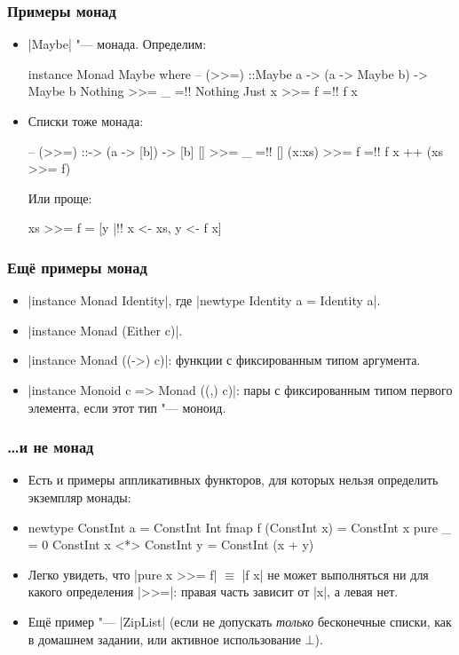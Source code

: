 \documentclass[11pt]{beamer}
\begin{document}
\begin{frame}[fragile]
  \frametitle{Примеры монад}
  \begin{itemize}[<+->]
    \item \haskinline|Maybe| "--- монада. Определим:
          \begin{haskell}
            instance Monad Maybe where
              -- (>{}>=) ::\pause Maybe a -> (a -> Maybe b) -> Maybe b
              Nothing >>= _ =!\pause! Nothing
              Just x  >>= f =!\pause! f x
          \end{haskell}
    \item Списки тоже монада:
          \begin{haskell}
            -- (>{}>=) ::\pause [a] -> (a -> [b]) -> [b]
            []     >>= _ =!\pause! []
            (x:xs) >>= f =!\pause! f x ++ (xs >>= f)
          \end{haskell}
          Или проще:
          \begin{haskell}
            xs >>= f = [y |!\pause! x <- xs, y <- f x]
          \end{haskell}
  \end{itemize}
\end{frame}

\begin{frame}[fragile]
  \frametitle{Ещё примеры монад}
  \begin{itemize}
    \item \haskinline|instance Monad Identity|, где \haskinline|newtype Identity a = Identity a|.
    \item \haskinline|instance Monad (Either c)|.
    \item \haskinline|instance Monad ((->) c)|: функции с фиксированным типом аргумента.
    \item \haskinline|instance Monoid c => Monad ((,) c)|: пары с фиксированным типом первого элемента, если этот тип "--- моноид.
  \end{itemize}
\end{frame}

\begin{frame}[fragile]
  \frametitle{\ldots и не монад}
  \begin{itemize}
    \item Есть и примеры аппликативных функторов, для которых нельзя определить экземпляр монады:
    \item
          \begin{haskell}
            newtype ConstInt a = ConstInt Int
            fmap f (ConstInt x) = ConstInt x
            pure _ = 0
            ConstInt x <*> ConstInt y = ConstInt (x + y)
          \end{haskell}
    \item Легко увидеть, что \haskinline|pure x >>= f| $\equiv$ \haskinline|f x| не может выполняться ни для какого определения \haskinline|>>=|: правая часть зависит от \haskinline|x|, а левая нет.
          \pause
    \item Ещё пример "--- \haskinline|ZipList| (если не допускать \emph{только} бесконечные списки, как в домашнем задании, или активное использование $\bot$).
  \end{itemize}
\end{frame}
\end{document}
